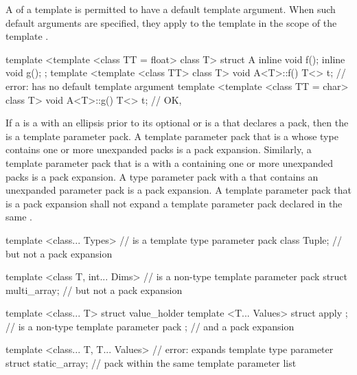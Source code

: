 \pnum
A  of
a template 
is permitted to have a default template argument.
When such default arguments are specified,
they apply to the template 
in the scope of the template .
\begin{example}
\begin{codeblock}
template <template <class TT = float> class T> struct A {
  inline void f();
  inline void g();
};
template <template <class TT> class T> void A<T>::f() {
  T<> t;            // error:  has no default template argument
}
template <template <class TT = char> class T> void A<T>::g() {
  T<> t;            // OK, 
}
\end{codeblock}
\end{example}

\pnum
If a  is a
 with an ellipsis prior to its
optional  or is a
 that declares a
pack, then the 
is a template parameter pack.
A template parameter pack that is a  whose type
contains one or more unexpanded packs is a pack expansion. Similarly,
a template parameter pack that is a  with a
 containing one or more unexpanded
packs is a pack expansion.
A type parameter pack with a  that
contains an unexpanded parameter pack is a pack expansion.
A template parameter pack that is a pack
expansion shall not expand a template parameter pack declared in the same
.
\begin{example}
\begin{codeblock}
template <class... Types>                       //  is a template type parameter pack
   class Tuple;                                 // but not a pack expansion

template <class T, int... Dims>                 //  is a non-type template parameter pack
   struct multi_array;                          // but not a pack expansion

template <class... T>
  struct value_holder {
    template <T... Values> struct apply { };    //  is a non-type template parameter pack
  };                                            // and a pack expansion

template <class... T, T... Values>              // error:  expands template type parameter
  struct static_array;                          // pack  within the same template parameter list
\end{codeblock}
\end{example}

